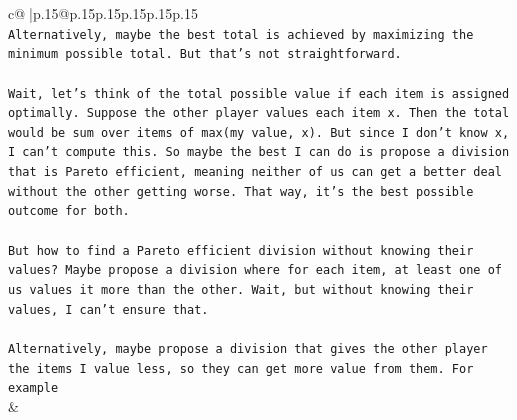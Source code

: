 \documentclass{article}
\begin{document}
{\begin{supertabular}{c@{$\;$}|p{.15\linewidth}@{}p{.15\linewidth}p{.15\linewidth}p{.15\linewidth}p{.15\linewidth}p{.15\linewidth}}
{{{\\ 
\texttt{Alternatively, maybe the best total is achieved by maximizing the minimum possible total. But that's not straightforward.} \\
\\ 
\texttt{Wait, let's think of the total possible value if each item is assigned optimally. Suppose the other player values each item x. Then the total would be sum over items of max(my value, x). But since I don't know x, I can't compute this. So maybe the best I can do is propose a division that is Pareto efficient, meaning neither of us can get a better deal without the other getting worse. That way, it's the best possible outcome for both.} \\
\\ 
\texttt{But how to find a Pareto efficient division without knowing their values? Maybe propose a division where for each item, at least one of us values it more than the other. Wait, but without knowing their values, I can't ensure that.} \\
\\ 
\texttt{Alternatively, maybe propose a division that gives the other player the items I value less, so they can get more value from them. For example} \\
            }
        }
    }
    & \\ \\


\end{supertabular}}
\end{document}
